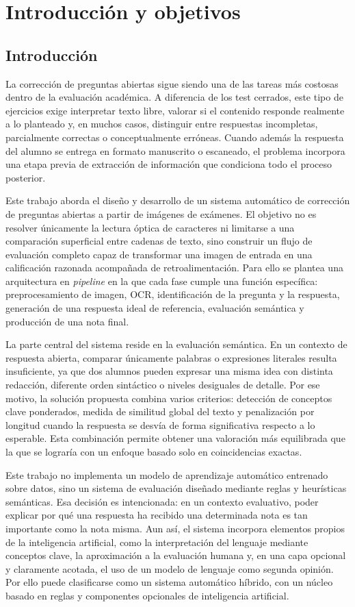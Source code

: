 \chapter{Introducción y objetivos}

\section{Introducción}

La corrección de preguntas abiertas sigue siendo una de las tareas más costosas dentro de la evaluación académica. A diferencia de los test cerrados, este tipo de ejercicios exige interpretar texto libre, valorar si el contenido responde realmente a lo planteado y, en muchos casos, distinguir entre respuestas incompletas, parcialmente correctas o conceptualmente erróneas. Cuando además la respuesta del alumno se entrega en formato manuscrito o escaneado, el problema incorpora una etapa previa de extracción de información que condiciona todo el proceso posterior.

Este trabajo aborda el diseño y desarrollo de un sistema automático de corrección de preguntas abiertas a partir de imágenes de exámenes. El objetivo no es resolver únicamente la lectura óptica de caracteres ni limitarse a una comparación superficial entre cadenas de texto, sino construir un flujo de evaluación completo capaz de transformar una imagen de entrada en una calificación razonada acompañada de retroalimentación. Para ello se plantea una arquitectura en \emph{pipeline} en la que cada fase cumple una función específica: preprocesamiento de imagen, OCR, identificación de la pregunta y la respuesta, generación de una respuesta ideal de referencia, evaluación semántica y producción de una nota final.

La parte central del sistema reside en la evaluación semántica. En un contexto de respuesta abierta, comparar únicamente palabras o expresiones literales resulta insuficiente, ya que dos alumnos pueden expresar una misma idea con distinta redacción, diferente orden sintáctico o niveles desiguales de detalle. Por ese motivo, la solución propuesta combina varios criterios: detección de conceptos clave ponderados, medida de similitud global del texto y penalización por longitud cuando la respuesta se desvía de forma significativa respecto a lo esperable. Esta combinación permite obtener una valoración más equilibrada que la que se lograría con un enfoque basado solo en coincidencias exactas.

Este trabajo no implementa un modelo de aprendizaje automático entrenado sobre datos, sino un sistema de evaluación diseñado mediante reglas y heurísticas semánticas. Esa decisión es intencionada: en un contexto evaluativo, poder explicar por qué una respuesta ha recibido una determinada nota es tan importante como la nota misma. Aun así, el sistema incorpora elementos propios de la inteligencia artificial, como la interpretación del lenguaje mediante conceptos clave, la aproximación a la evaluación humana y, en una capa opcional y claramente acotada, el uso de un modelo de lenguaje como segunda opinión. Por ello puede clasificarse como un sistema automático híbrido, con un núcleo basado en reglas y componentes opcionales de inteligencia artificial.

